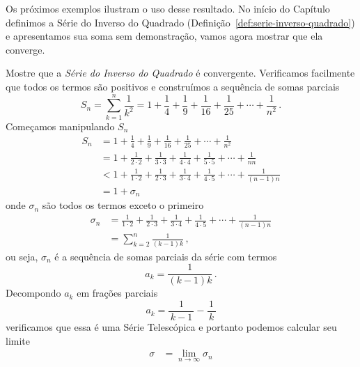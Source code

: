 Os próximos exemplos ilustram o uso desse resultado.
No início do Capítulo definimos a Série do Inverso do Quadrado
(Definição~\ref{def:serie-inverso-quadrado}) e apresentamos
sua soma sem demonstração, vamos agora mostrar que ela converge.

\begin{example}
  Mostre que a
  \emph{Série do Inverso do Quadrado}
  é convergente.
  \solution
  Verificamos facilmente que todos os termos são positivos e
  construímos a sequência de somas parciais
  \[
    S_n = \sum_{k=1}^n \frac{1}{k^2}
        = 1 + \frac{1}{4}
            + \frac{1}{9}
            + \frac{1}{16}
            + \frac{1}{25}
            + \cdots
            + \frac{1}{n^2}    \,.
  \]
  Começamos manipulando $S_n$
  \begin{align*}
    S_n & = 1 + \frac{1}{4}
        + \frac{1}{9}
        + \frac{1}{16}
        + \frac{1}{25}
        + \cdots
        + \frac{1}{n^2}    \\[3mm]
        & = 1 + \frac{1}{2\cdot 2}
        + \frac{1}{3\cdot 3}
        + \frac{1}{4\cdot 4}
        + \frac{1}{5\cdot 5}
        + \cdots
        + \frac{1}{nn}     \\[3mm]
        & < 1 + \frac{1}{1\cdot 2}
        + \frac{1}{2\cdot 3}
        + \frac{1}{3\cdot 4}
        + \frac{1}{4\cdot 5}
        + \cdots
        + \frac{1}{(n-1)n} \\[3mm]
        & = 1 + \sigma_n
  \end{align*}
  onde $\sigma_n$ são todos os termos exceto o primeiro
  \begin{align*}
    \sigma_n & = \frac{1}{1\cdot 2}
               + \frac{1}{2\cdot 3}
               + \frac{1}{3\cdot 4}
               + \frac{1}{4\cdot 5}
               + \cdots
               + \frac{1}{(n-1)n} \\[3mm]
             & = \sum_{k=2}^n \frac{1}{(k-1)k}            \,,
  \end{align*}
  ou seja, $\sigma_n$ é a sequência de somas parciais da série com termos
  \[
    a_k = \frac{1}{(k-1)k}         \,.
  \]
  Decompondo $a_k$ em frações parciais
  \[
    a_k = \frac{1}{\,k-1\,} - \frac{1}{\,k\,}
  \]
  verificamos que essa é uma Série Telescópica e portanto podemos calcular seu limite
  \begin{align*}
    \sigma & = \lim_{n\to\infty} \sigma_n  \\[3mm]

\end{align*}
\end{example}
